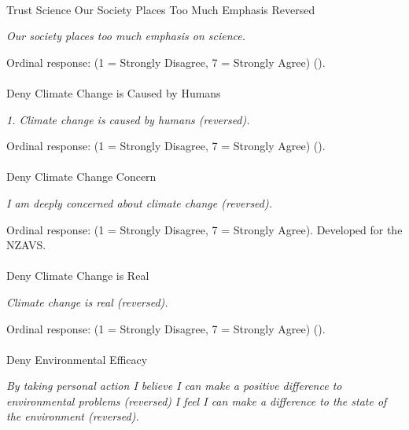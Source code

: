 \documentclass[
  single column]{article}
\makeatletter
\let\oldparagraph\paragraph
\renewcommand{\paragraph}{
    \@ifstar
      \xxxParagraphStar
      \xxxParagraphNoStar
  }
\newcommand{\xxxParagraphStar}[1]{\oldparagraph*{#1}\mbox{}}
\newcommand{\xxxParagraphNoStar}[1]{\oldparagraph{#1}\mbox{}}
\makeatother
\begin{document}
\paragraph{Trust Science Our Society Places Too Much Emphasis
Reversed}\label{trust-science-our-society-places-too-much-emphasis-reversed}

\emph{Our society places too much emphasis on science.}

Ordinal response: (1 = Strongly Disagree, 7 = Strongly Agree)
().

\paragraph{Deny Climate Change is Caused by
Humans}\label{deny-climate-change-is-caused-by-humans}

\emph{1. Climate change is caused by humans (reversed).}

Ordinal response: (1 = Strongly Disagree, 7 = Strongly Agree)
().

\paragraph{Deny Climate Change
Concern}\label{deny-climate-change-concern-1}

\emph{I am deeply concerned about climate change (reversed).}

Ordinal response: (1 = Strongly Disagree, 7 = Strongly Agree). Developed
for the NZAVS.

\paragraph{Deny Climate Change is
Real}\label{deny-climate-change-is-real}

\emph{Climate change is real (reversed).}

Ordinal response: (1 = Strongly Disagree, 7 = Strongly Agree)
().

\paragraph{Deny Environmental
Efficacy}\label{deny-environmental-efficacy-1}

\emph{By taking personal action I believe I can make a positive
difference to environmental problems (reversed)} \emph{I feel I can make
a difference to the state of the environment (reversed).}
\end{document}
